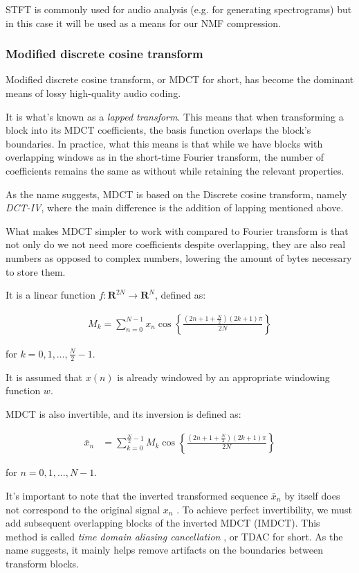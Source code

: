 STFT is commonly used for audio analysis (e.g. for generating spectrograms) but in this case it will be used as a means for our NMF compression.

\subsubsection{Modified discrete cosine transform}
Modified discrete cosine transform, or MDCT for short, has become the dominant means of lossy high-quality audio coding. \cite{wang_vilermo_2012_mdct}

It is what's known as a \emph{lapped transform}. This means that when transforming a block into its MDCT coefficients, the basis function overlaps the block's boundaries. \cite{Malvar:1992:SPL:531523} In practice, what this means is that while we have blocks with overlapping windows as in the short-time Fourier transform, the number of coefficients remains the same as without while retaining the relevant properties.

As the name suggests, MDCT is based on the Discrete cosine transform, namely \emph{DCT-IV}, where the main difference is the addition of lapping mentioned above.

What makes MDCT simpler to work with compared to Fourier transform is that not only do we not need more coefficients despite overlapping, they are also real numbers as opposed to complex numbers, lowering the amount of bytes necessary to store them.

It is a linear function $f: \mathbf{R}^{2N} \rightarrow \mathbf{R}^N$, defined as: \cite{Babu2013FastAE}

\begin{align}
M_k = \sum_{n=0}^{N-1} x_n \cos \left\lbrace \frac{(2n+1+ \frac{N}{2} )(2k+1)\pi }{2N} \right\rbrace
\end{align}

for $k = 0, 1, \ldots, \frac{N}{2}-1$.

It is assumed that $x(n)$ is already windowed by an appropriate windowing function $w$.

MDCT is also invertible, and its inversion is defined as:

\begin{align}
\bar{x}_n &= \sum_{k=0}^{\frac{N}{2}-1} M_k \cos \left\lbrace \frac{(2n+1+ \frac{N}{2} )(2k+1)\pi }{2N} \right\rbrace
\end{align}

for $n = 0, 1, \ldots, N-1$.

It's important to note that the inverted transformed sequence $\bar{x}_n$ by itself does not correspond to the original signal $x_n$ \cite{prince_1986_tdac_1}. To achieve perfect invertibility, we must add subsequent overlapping blocks of the inverted MDCT (IMDCT). This method is called \emph{time domain aliasing cancellation} \cite{prince_1986_tdac_2}, or TDAC for short. As the name suggests, it mainly helps remove artifacts on the boundaries between transform blocks.

